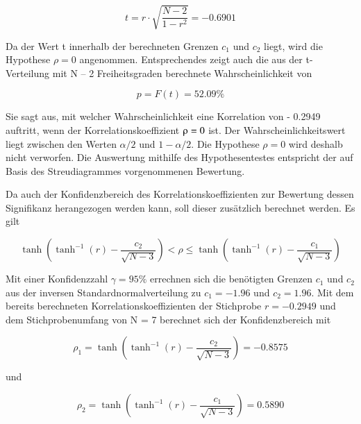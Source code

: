\begin{equation}\label{eq:tensixtythree}
t=r\cdot \sqrt{\dfrac{N-2}{1-r^{2}}} =-0.6901
\end{equation}

\noindent Da der Wert t innerhalb der berechneten Grenzen $c_{1}$ und $c_{2}$ liegt, wird die Hypothese $\rho = 0$ angenommen. Entsprechendes zeigt auch die aus der t-Verteilung mit N -- 2 Freiheitsgraden berechnete Wahrscheinlichkeit von

\begin{equation}\label{eq:tensixtyfour}
p=F(t)=52.09 \%
\end{equation}

\noindent Sie sagt aus, mit welcher Wahrscheinlichkeit eine Korrelation von - 0.2949 auftritt, wenn der Korrelationskoeffizient $\rhoup = 0$ ist. Der Wahrscheinlichkeitswert liegt zwischen den Werten $\alpha/2$ und $1 - \alpha/2$. Die Hypothese $\rho = 0$ wird deshalb nicht verworfen. Die Auswertung mithilfe des Hypothesentestes entspricht der auf Basis des Streudiagrammes vorgenommenen Bewertung.\newline

\noindent Da auch der Konfidenzbereich des Korrelationskoeffizienten zur Bewertung dessen Signifikanz herangezogen werden kann, soll dieser zus\"{a}tzlich berechnet werden. Es gilt

\begin{equation}\label{eq:tensixtyfive}
\tanh \left(\tanh ^{-1} (r)-\dfrac{c_{2} }{\sqrt{N-3}} \right)<\rho \le \tanh \left(\tanh ^{-1} (r)-\dfrac{c_{1}}{\sqrt{N-3}} \right)
\end{equation}

\noindent Mit einer Konfidenzzahl $\gamma = 95 \%$ errechnen sich die ben\"{o}tigten Grenzen $c_{1}$ und $c_{2}$ aus der inversen Standardnormalverteilung zu $c_{1} = - 1.96$ und $c_{2} = 1.96$. Mit dem bereits berechneten Korrelationskoeffizienten der Stichprobe $r = - 0.2949$ und dem Stichprobenumfang von N = 7 berechnet sich der Konfidenzbereich mit

\begin{equation}\label{eq:tensixtysix}
\rho _{1} =\tanh \left(\tanh ^{-1} (r)-\dfrac{c_{2}}{\sqrt{N-3}} \right)=-0.8575
\end{equation}

\noindent und

\begin{equation}\label{eq:tensixtyseven}
\rho _{2} =\tanh \left(\tanh ^{-1} (r)-\dfrac{c_{1}}{\sqrt{N-3}} \right)=0.5890
\end{equation}

